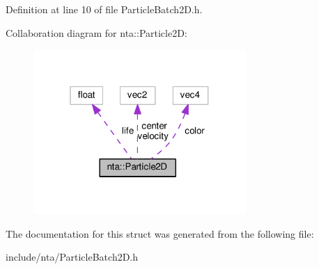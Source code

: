 Definition at line 10 of file Particle\+Batch2\+D.\+h.



Collaboration diagram for nta\+:\+:Particle2D\+:\nopagebreak
\begin{figure}[H]
\begin{center}
\leavevmode
\includegraphics[width=229pt]{df/d87/structnta_1_1Particle2D__coll__graph}
\end{center}
\end{figure}


The documentation for this struct was generated from the following file\+:\begin{DoxyCompactItemize}
\item 
include/nta/Particle\+Batch2\+D.\+h\end{DoxyCompactItemize}
